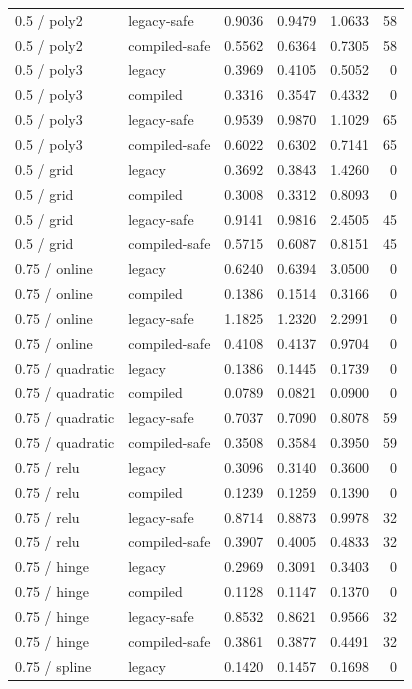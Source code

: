 \begin{longtable}{@{}llrrrr@{}}
0.5 / poly2 & legacy-safe & 0.9036 & 0.9479 & 1.0633 & 58\\
0.5 / poly2 & compiled-safe & 0.5562 & 0.6364 & 0.7305 & 58\\
0.5 / poly3 & legacy & 0.3969 & 0.4105 & 0.5052 & 0\\
0.5 / poly3 & compiled & 0.3316 & 0.3547 & 0.4332 & 0\\
0.5 / poly3 & legacy-safe & 0.9539 & 0.9870 & 1.1029 & 65\\
0.5 / poly3 & compiled-safe & 0.6022 & 0.6302 & 0.7141 & 65\\
0.5 / grid & legacy & 0.3692 & 0.3843 & 1.4260 & 0\\
0.5 / grid & compiled & 0.3008 & 0.3312 & 0.8093 & 0\\
0.5 / grid & legacy-safe & 0.9141 & 0.9816 & 2.4505 & 45\\
0.5 / grid & compiled-safe & 0.5715 & 0.6087 & 0.8151 & 45\\
0.75 / online & legacy & 0.6240 & 0.6394 & 3.0500 & 0\\
0.75 / online & compiled & 0.1386 & 0.1514 & 0.3166 & 0\\
0.75 / online & legacy-safe & 1.1825 & 1.2320 & 2.2991 & 0\\
0.75 / online & compiled-safe & 0.4108 & 0.4137 & 0.9704 & 0\\
0.75 / quadratic & legacy & 0.1386 & 0.1445 & 0.1739 & 0\\
0.75 / quadratic & compiled & 0.0789 & 0.0821 & 0.0900 & 0\\
0.75 / quadratic & legacy-safe & 0.7037 & 0.7090 & 0.8078 & 59\\
0.75 / quadratic & compiled-safe & 0.3508 & 0.3584 & 0.3950 & 59\\
0.75 / relu & legacy & 0.3096 & 0.3140 & 0.3600 & 0\\
0.75 / relu & compiled & 0.1239 & 0.1259 & 0.1390 & 0\\
0.75 / relu & legacy-safe & 0.8714 & 0.8873 & 0.9978 & 32\\
0.75 / relu & compiled-safe & 0.3907 & 0.4005 & 0.4833 & 32\\
0.75 / hinge & legacy & 0.2969 & 0.3091 & 0.3403 & 0\\
0.75 / hinge & compiled & 0.1128 & 0.1147 & 0.1370 & 0\\
0.75 / hinge & legacy-safe & 0.8532 & 0.8621 & 0.9566 & 32\\
0.75 / hinge & compiled-safe & 0.3861 & 0.3877 & 0.4491 & 32\\
0.75 / spline & legacy & 0.1420 & 0.1457 & 0.1698 & 0\\

\end{longtable}
